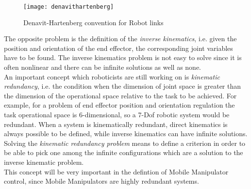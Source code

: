 \begin{figure}[h!]
	\centering
	\texttt{[image: denavithartenberg]}
	\caption{Denavit-Hartenberg convention for Robot links}
	\label{fig:DH}
\end{figure}

The opposite problem is the definition of the \textit{inverse kinematics}, i.e. given the position and orientation of the end effector, the corresponding joint variables have to be found. The inverse kinematics problem is not easy to solve since it is often nonlinear and there can be infinite solutions as well as none.\\
An important concept which roboticists are still working on is \textit{kinematic redundancy}, i.e. the condition when the dimension of joint space is greater than the dimension of the operational space relative to the task to be achieved. For example, for a problem of end effector position and orientation regulation the task operational space is 6-dimensional, so a 7-Dof robotic system would be redundant.
When a system is kinematically redundant, direct kinematics is always possible to be defined, while inverse kinematics can have infinite solutions.
Solving the \textit{kinematic redundancy problem} means to define a criterion in order to be able to pick one among the infinite configurations which are a solution to the inverse kinematic problem.\\
This concept will be very important in the defintion of Mobile Manipulator control, since Mobile Manipulators are highly redundant systems.

